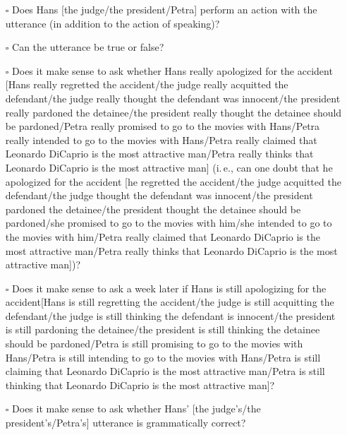 \documentclass[egregdoesnotlikesansseriftitles,12pt]{scrartcl}
\begin{document}
\begin{itemize}
\item[$\square$]Does Hans [the judge/the president/Petra] perform an action with the utterance (in addition to the action of speaking)?

\item[$\square$]Can the utterance be true or false?

\item[$\square$]Does it make sense to ask whether Hans really apologized for the accident [Hans really regretted the accident/the judge really acquitted the defendant/the judge really thought the defendant was innocent/the president really pardoned the detainee/the president really thought the detainee should be pardoned/Petra really promised to go to the movies with Hans/Petra really intended to go to the movies with Hans/Petra really claimed that Leonardo DiCaprio is the most attractive man/Petra really thinks that Leonardo DiCaprio is the most attractive man] (i.\,e., can one doubt that he apologized for the accident [he regretted the accident/the judge acquitted the defendant/the judge thought the defendant was innocent/the president pardoned the detainee/the president thought the detainee should be pardoned/she promised to go to the movies with him/she intended to go to the movies with him/Petra really claimed that Leonardo DiCaprio is the most attractive man/Petra really thinks that Leonardo DiCaprio is the most attractive man])?

\item[$\square$]Does it make sense to ask a week later if Hans is still apologizing for the accident[Hans is still regretting the accident/the judge is still acquitting the defendant/the judge is still thinking the defendant is innocent/the president is still pardoning the detainee/the president is still thinking the detainee should be pardoned/Petra is still promising to go to the movies with Hans/Petra is still intending to go to the movies with Hans/Petra is still claiming that Leonardo DiCaprio is the most attractive man/Petra is still thinking that Leonardo DiCaprio is the most attractive man]?

\item[$\square$]Does it make sense to ask whether Hans' [the judge's/the president's/Petra's] utterance is grammatically correct?
\end{itemize}
\end{document}
